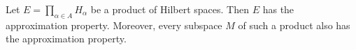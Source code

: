 Let $E = \prod_{\alpha \in A} H_{\alpha}$ be a product of Hilbert spaces. Then $E$ has the approximation property. Moreover, every subspace $M$ of such a product also has the approximation property.
